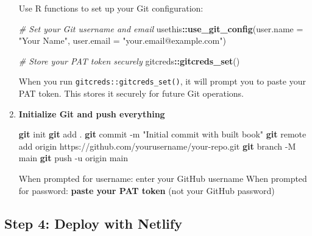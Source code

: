 \documentclass[
]{book}
\newenvironment{Shaded}{\begin{snugshade}}{\end{snugshade}}
\newcommand{\AttributeTok}[1]{\textcolor[rgb]{0.13,0.29,0.53}{#1}}
\newcommand{\CommentTok}[1]{\textcolor[rgb]{0.56,0.35,0.01}{\textit{#1}}}
\newcommand{\FunctionTok}[1]{\textcolor[rgb]{0.13,0.29,0.53}{\textbf{#1}}}
\newcommand{\NormalTok}[1]{#1}
\newcommand{\SpecialCharTok}[1]{\textcolor[rgb]{0.81,0.36,0.00}{\textbf{#1}}}
\newcommand{\StringTok}[1]{\textcolor[rgb]{0.31,0.60,0.02}{#1}}
\begin{document}
\begin{enumerate}
  Use R functions to set up your Git configuration:

\begin{Shaded}
\begin{Highlighting}[]
\CommentTok{\# Set your Git username and email}
\NormalTok{usethis}\SpecialCharTok{::}\FunctionTok{use\_git\_config}\NormalTok{(}\AttributeTok{user.name =} \StringTok{"Your Name"}\NormalTok{, }
                       \AttributeTok{user.email =} \StringTok{"your.email@example.com"}\NormalTok{)}

\CommentTok{\# Store your PAT token securely}
\NormalTok{gitcreds}\SpecialCharTok{::}\FunctionTok{gitcreds\_set}\NormalTok{()}
\end{Highlighting}
\end{Shaded}

  When you run \texttt{gitcreds::gitcreds\_set()}, it will prompt you to paste your PAT token. This stores it securely for future Git operations.
\item
  \textbf{Initialize Git and push everything}

\begin{Shaded}
\begin{Highlighting}[]
\FunctionTok{git}\NormalTok{ init}
\FunctionTok{git}\NormalTok{ add .}
\FunctionTok{git}\NormalTok{ commit }\AttributeTok{{-}m} \StringTok{"Initial commit with built book"}
\FunctionTok{git}\NormalTok{ remote add origin https://github.com/yourusername/your{-}repo.git}
\FunctionTok{git}\NormalTok{ branch }\AttributeTok{{-}M}\NormalTok{ main}
\FunctionTok{git}\NormalTok{ push }\AttributeTok{{-}u}\NormalTok{ origin main}
\end{Highlighting}
\end{Shaded}

  When prompted for username: enter your GitHub username
  When prompted for password: \textbf{paste your PAT token} (not your GitHub password)
\end{enumerate}

\subsection{Step 4: Deploy with Netlify}\label{step-4-deploy-with-netlify}
\end{document}
